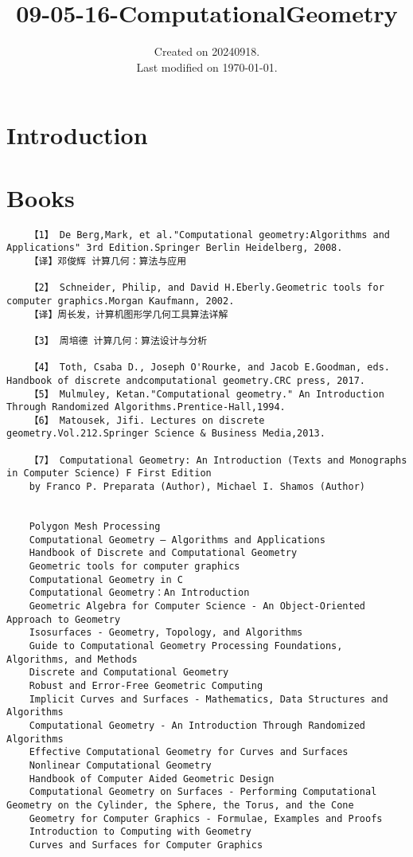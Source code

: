 \documentclass[UTF8]{../09-Mathematics}
\begin{document}
\title{09-05-16-ComputationalGeometry}
\date{Created on 20240918.\\   Last modified on \today.}
\maketitle
\tableofcontents


\chapter{Introduction}

\chapter{Books}

\begin{lstlisting}
    【1】 De Berg,Mark, et al."Computational geometry:Algorithms and Applications" 3rd Edition.Springer Berlin Heidelberg, 2008.
    【译】邓俊辉 计算几何：算法与应用
    
    【2】 Schneider, Philip, and David H.Eberly.Geometric tools for computer graphics.Morgan Kaufmann, 2002.
    【译】周长发，计算机图形学几何工具算法详解

    【3】 周培德 计算几何：算法设计与分析

    【4】 Toth, Csaba D., Joseph O'Rourke, and Jacob E.Goodman, eds. Handbook of discrete andcomputational geometry.CRC press, 2017.
    【5】 Mulmuley, Ketan."Computational geometry." An Introduction Through Randomized Algorithms.Prentice-Hall,1994.
    【6】 Matousek, Jifi. Lectures on discrete geometry.Vol.212.Springer Science & Business Media,2013.

    【7】 Computational Geometry: An Introduction (Texts and Monographs in Computer Science) F First Edition
    by Franco P. Preparata (Author), Michael I. Shamos (Author)

    
    Polygon Mesh Processing
    Computational Geometry – Algorithms and Applications
    Handbook of Discrete and Computational Geometry
    Geometric tools for computer graphics
    Computational Geometry in C
    Computational Geometry：An Introduction
    Geometric Algebra for Computer Science - An Object-Oriented Approach to Geometry
    Isosurfaces - Geometry, Topology, and Algorithms
    Guide to Computational Geometry Processing Foundations, Algorithms, and Methods
    Discrete and Computational Geometry
    Robust and Error-Free Geometric Computing
    Implicit Curves and Surfaces - Mathematics, Data Structures and Algorithms
    Computational Geometry - An Introduction Through Randomized Algorithms
    Effective Computational Geometry for Curves and Surfaces
    Nonlinear Computational Geometry
    Handbook of Computer Aided Geometric Design
    Computational Geometry on Surfaces - Performing Computational Geometry on the Cylinder, the Sphere, the Torus, and the Cone
    Geometry for Computer Graphics - Formulae, Examples and Proofs
    Introduction to Computing with Geometry
    Curves and Surfaces for Computer Graphics
    



    
\end{lstlisting}
\end{document}
